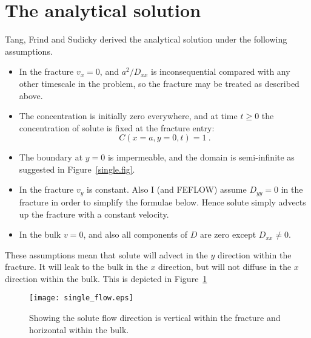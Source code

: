 \documentclass[]{scrreprt}
\begin{document}
\section{The analytical solution}

Tang, Frind and Sudicky derived the analytical solution under the
following assumptions.
\begin{itemize}
\item In the fracture $v_{x} = 0$, and $a^{2}/D_{xx}$ is
  inconsequential compared with any other timescale in the problem, so
  the fracture may be treated as described above.
\item The concentration is initially zero everywhere, and at time
  $t\geq 0$ the concentration of solute is fixed at the fracture entry:
\begin{equation}
C(x=a, y=0, t) = 1 \ .
\end{equation}
\item The boundary at $y=0$ is impermeable, and the domain is
  semi-infinite as suggested in Figure~\ref{single.fig}.
\item In the fracture $v_{y}$ is constant.  Also I (and FEFLOW) assume
  $D_{yy}=0$ in the fracture in order to simplify the formulae below.
  Hence solute simply advects up the fracture with a constant
  velocity.
\item In the bulk $v=0$, and also all components of $D$ are zero
  except $D_{xx}\neq 0$.
\end{itemize}
These assumptions mean that solute will advect in the $y$ direction
within the fracture.  It will leak to the bulk in the $x$ direction,
but will not diffuse in the $x$ direction within the bulk.  This is
depicted in Figure~\ref{single_flow.fig}

\begin{figure}[htb]
\centering
\texttt{[image: single\_flow.eps]}
\caption{Showing the solute flow direction is vertical within the
  fracture and horizontal within the bulk.}
\label{single_flow.fig}
\end{figure}
\end{document}
